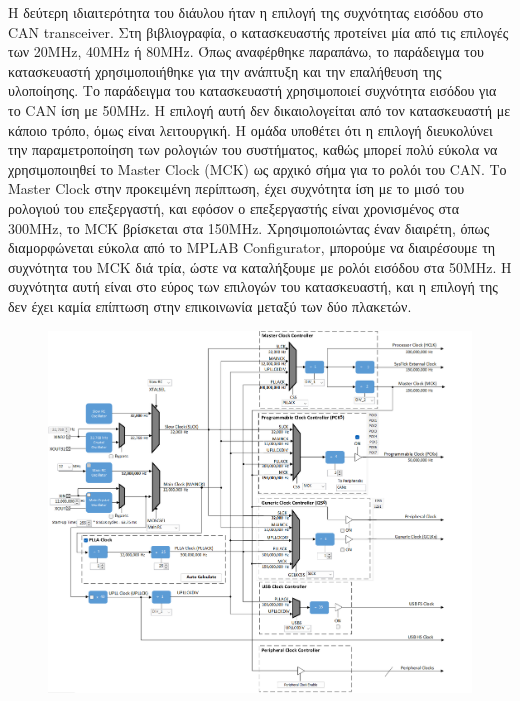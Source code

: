 \documentclass[a4paper,nobib,justified]{tufte-book}
\begin{document}
Η δεύτερη ιδιαιτερότητα του διάυλου ήταν η επιλογή της συχνότητας εισόδου στο CAN transceiver. Στη βιβλιογραφία, ο κατασκευαστής προτείνει μία από τις επιλογές των 20MHz, 40MHz ή 80MHz. Όπως αναφέρθηκε παραπάνω, το παράδειγμα του κατασκευαστή χρησιμοποιήθηκε για την ανάπτυξη και την επαλήθευση της υλοποίησης. Το παράδειγμα του κατασκευαστή χρησιμοποιεί συχνότητα εισόδου για το CAN ίση με 50MHz. Η επιλογή αυτή δεν δικαιολογείται από τον κατασκευαστή με κάποιο τρόπο, όμως είναι λειτουργική. Η ομάδα υποθέτει ότι η επιλογή διευκολύνει την παραμετροποίηση των ρολογιών του συστήματος, καθώς μπορεί πολύ εύκολα να χρησιμοποιηθεί το Master Clock (MCK) ως αρχικό σήμα για το ρολόι του CAN. Το Master Clock στην προκειμένη περίπτωση, έχει συχνότητα ίση με το μισό του ρολογιού του επεξεργαστή, και εφόσον ο επεξεργαστής είναι χρονισμένος στα 300MHz, το MCK βρίσκεται στα 150MHz. Χρησιμοποιώντας έναν διαιρέτη, όπως διαμορφώνεται εύκολα από το MPLAB Configurator, μπορούμε να διαιρέσουμε τη συχνότητα του MCK διά τρία, ώστε να καταλήξουμε με ρολόι εισόδου στα 50MHz. Η συχνότητα αυτή είναι στο εύρος των επιλογών του κατασκευαστή, και η επιλογή της δεν έχει καμία επίπτωση στην επικοινωνία μεταξύ των δύο πλακετών.

\begin{figure}[ht]
	\label{fig:mplab-clock}
	\includegraphics{media/images/mplab-clock-diagram.png}
\end{figure}

\end{document}
